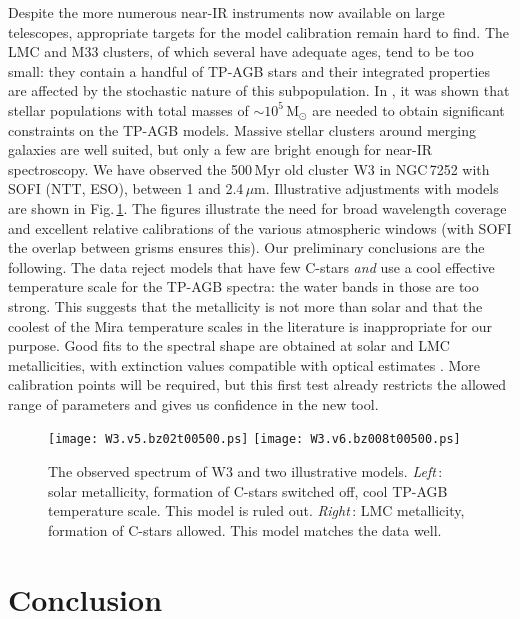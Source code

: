 \documentclass[runningheads]{svmult}
\begin{document}
Despite the more numerous near-IR instruments now available on large
telescopes, appropriate targets for the model calibration
remain hard to find. The LMC and M33
clusters, of which several have adequate ages, tend to be too small:
they contain a handful of TP-AGB stars and their integrated properties
are affected by the stochastic nature of this subpopulation. In \cite{LW00},
it was shown that stellar populations with total masses of 
$\sim 10^5$\,M$_{\odot}$ are needed to obtain significant
constraints on the TP-AGB models.
Massive stellar clusters around
merging galaxies are well suited, but only a few are bright enough
for near-IR spectroscopy. We have observed the 500\,Myr old cluster W3
in NGC\,7252 with SOFI (NTT, ESO), between 1 and 2.4\,$\mu$m. Illustrative
adjustments with models are shown in Fig.\,\ref{fits.fig}. The figures 
illustrate the need for broad wavelength coverage and excellent
relative calibrations of the various atmospheric windows (with SOFI
the overlap between grisms ensures this). Our preliminary conclusions
are the following. The data reject models that have few C-stars
{\em and} use a cool effective temperature scale for the TP-AGB
spectra: the water bands in those are too strong. This suggests that
the metallicity is not more than solar and that the coolest of the
Mira temperature scales in the literature is inappropriate for our
purpose. Good fits to the spectral shape
are obtained at solar and LMC metallicities, with extinction values
compatible with optical estimates \cite{SS98}.  
More calibration points will be required, but this first test
already restricts the allowed range of parameters and gives us
confidence in the new tool.

\begin{figure}
\texttt{[image: W3.v5.bz02t00500.ps]}
\texttt{[image: W3.v6.bz008t00500.ps]}
\caption[]{The observed spectrum of W3 and two illustrative models.
{\em Left}\,: solar metallicity, formation of C-stars switched off,
cool TP-AGB temperature scale. This model is ruled out. {\em Right}\,:
LMC metallicity, formation of C-stars allowed. This model matches the
data well.}
\label{fits.fig}
\end{figure}

\section{Conclusion}
\end{document}
